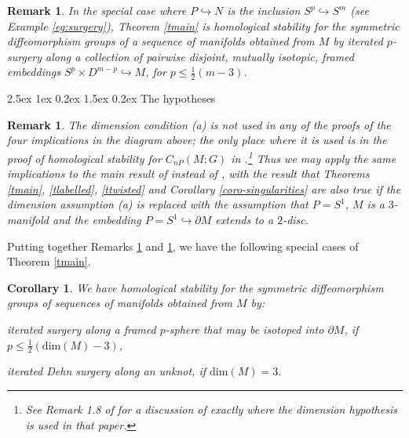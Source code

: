 \documentclass[reqno,a4paper]{article}
\makeatletter
\numberwithin{equation}{section}
\theoremstyle{italicised}
\newtheorem{coro}[thm]{Corollary}
\theoremstyle{upright}
\newtheorem{rmk}[thm]{Remark}
\theoremstyle{italicised-restate}
\renewcommand*{\subsection}{\@startsection{subsection}{2}{\z@}%
	{2.5ex \@plus 1ex \@minus 0.2ex}%
	{1.5ex \@plus 0.2ex}%
	{\normalfont\normalsize\bfseries}}
\newenvironment{itemizeb}%
{\begin{compactitem}
\renewcommand{\labelitemi}{\ensuremath{\bullet}}
\renewcommand{\labelitemii}{\ensuremath{\bullet}}}%
{\end{compactitem}}
\renewcommand{\leq}{\leqslant}
\makeatother
\begin{document}
\begin{rmk}
\label{rmk:surgery}
In the special case where $P \hookrightarrow N$ is the inclusion $S^p \hookrightarrow S^m$ (see Example \ref{eg:surgery}), Theorem \ref{tmain} is homological stability for the symmetric diffeomorphism groups of a sequence of manifolds obtained from $M$ by iterated $p$-surgery along a collection of pairwise disjoint, mutually isotopic, framed embeddings $S^p \times D^{m-p} \hookrightarrow M$, for $p \leq \tfrac12(m-3)$.
\end{rmk}


\subsection{The hypotheses}\label{ss:hypotheses}


\begin{rmk}
\label{rmk:Dehn-surgery}
The dimension condition (a) is not used in any of the proofs of the four implications in the diagram above; the only place where it is used is in the proof of homological stability for $C_{nP}(M;G)$ in \cite{Palmer2018HomologicalstabilitymoduliI}.\footnote{See Remark 1.8 of \cite{Palmer2018HomologicalstabilitymoduliI} for a discussion of exactly where the dimension hypothesis is used in that paper.} Thus we may apply the same implications to the main result of \cite{Kupers2020unlinkedcircles} instead of \cite{Palmer2018HomologicalstabilitymoduliI}, with the result that Theorems \ref{tmain}, \ref{tlabelled}, \ref{ttwisted} and Corollary \ref{coro-singularities} are also true if the dimension assumption (a) is replaced with the assumption that $P=S^1$, $M$ is a $3$-manifold and the embedding $P=S^1 \hookrightarrow \partial M$ extends to a $2$-disc.
\end{rmk}

Putting together Remarks \ref{rmk:surgery} and \ref{rmk:Dehn-surgery}, we have the following special cases of Theorem \ref{tmain}.

\begin{coro}
We have homological stability for the symmetric diffeomorphism groups of sequences of manifolds obtained from $M$ by:
\begin{itemizeb}
\item iterated surgery along a framed $p$-sphere that may be isotoped into $\partial M$, if $p \leq \tfrac12(\mathrm{dim}(M)-3)$,
\item iterated Dehn surgery along an unknot, if $\mathrm{dim}(M) = 3$.
\end{itemizeb}
\end{coro}
\end{document}
